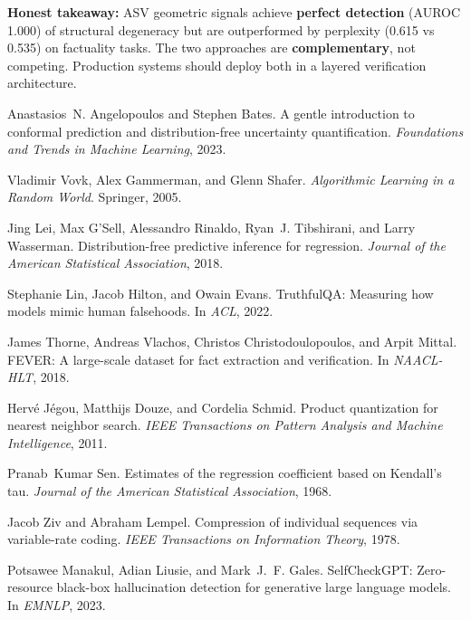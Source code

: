 \documentclass[11pt]{article}
\begin{document}
\textbf{Honest takeaway:} ASV geometric signals achieve \textbf{perfect detection} (AUROC 1.000) of structural degeneracy but are outperformed by perplexity (0.615 vs 0.535) on factuality tasks. The two approaches are \textbf{complementary}, not competing. Production systems should deploy both in a layered verification architecture.


\begin{thebibliography}{10}

Anastasios~N. Angelopoulos and Stephen Bates.
\newblock A gentle introduction to conformal prediction and distribution-free uncertainty quantification.
\newblock \emph{Foundations and Trends in Machine Learning}, 2023.

Vladimir Vovk, Alex Gammerman, and Glenn Shafer.
\newblock \emph{Algorithmic Learning in a Random World}.
\newblock Springer, 2005.

Jing Lei, Max G'Sell, Alessandro Rinaldo, Ryan~J. Tibshirani, and Larry Wasserman.
\newblock Distribution-free predictive inference for regression.
\newblock \emph{Journal of the American Statistical Association}, 2018.

Stephanie Lin, Jacob Hilton, and Owain Evans.
\newblock TruthfulQA: Measuring how models mimic human falsehoods.
\newblock In \emph{ACL}, 2022.

James Thorne, Andreas Vlachos, Christos Christodoulopoulos, and Arpit Mittal.
\newblock FEVER: A large-scale dataset for fact extraction and verification.
\newblock In \emph{NAACL-HLT}, 2018.

Hervé Jégou, Matthijs Douze, and Cordelia Schmid.
\newblock Product quantization for nearest neighbor search.
\newblock \emph{IEEE Transactions on Pattern Analysis and Machine Intelligence}, 2011.

Pranab~Kumar Sen.
\newblock Estimates of the regression coefficient based on Kendall's tau.
\newblock \emph{Journal of the American Statistical Association}, 1968.

Jacob Ziv and Abraham Lempel.
\newblock Compression of individual sequences via variable-rate coding.
\newblock \emph{IEEE Transactions on Information Theory}, 1978.

Potsawee Manakul, Adian Liusie, and Mark~J.~F. Gales.
\newblock SelfCheckGPT: Zero-resource black-box hallucination detection for generative large language models.
\newblock In \emph{EMNLP}, 2023.

\end{thebibliography}
\end{document}
